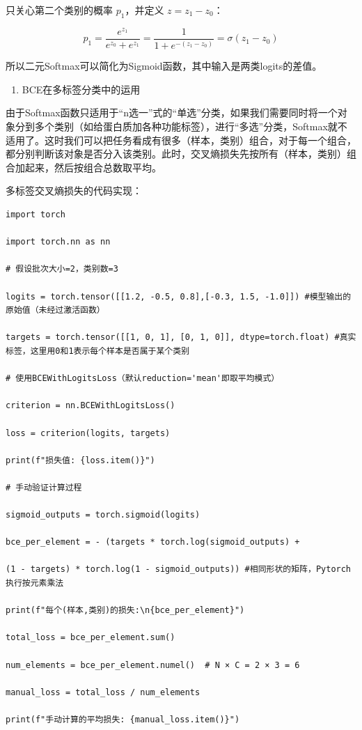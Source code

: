 只关心第二个类别的概率 \(p_1\)，并定义 \(z=z_1-z_0\)：

\[
p_1=\frac{e^{z_1}}{e^{z_0}+e^{z_1}}
=\frac{1}{1+e^{-(z_1-z_0)}}
=\sigma(z_1-z_0)
\]

所以二元Softmax可以简化为Sigmoid函数，其中输入是两类logits的差值。

\begin{enumerate}
\def\labelenumi{\arabic{enumi}.}
\setcounter{enumi}{2}
\tightlist
\item
  BCE在多标签分类中的运用
\end{enumerate}

由于Softmax函数只适用于``n选一''式的``单选''分类，如果我们需要同时将一个对象分到多个类别（如给蛋白质加各种功能标签），进行``多选''分类，Softmax就不适用了。这时我们可以把任务看成有很多（样本，类别）组合，对于每一个组合，都分别判断该对象是否分入该类别。此时，交叉熵损失先按所有（样本，类别）组合加起来，然后按组合总数取平均。

多标签交叉熵损失的代码实现：

\begin{verbatim}
import torch

import torch.nn as nn

# 假设批次大小=2，类别数=3

logits = torch.tensor([[1.2, -0.5, 0.8],[-0.3, 1.5, -1.0]]) #模型输出的原始值（未经过激活函数）

targets = torch.tensor([[1, 0, 1], [0, 1, 0]], dtype=torch.float) #真实标签，这里用0和1表示每个样本是否属于某个类别

# 使用BCEWithLogitsLoss（默认reduction='mean'即取平均模式）

criterion = nn.BCEWithLogitsLoss()

loss = criterion(logits, targets)

print(f"损失值: {loss.item()}")

# 手动验证计算过程

sigmoid_outputs = torch.sigmoid(logits)

bce_per_element = - (targets * torch.log(sigmoid_outputs) +

(1 - targets) * torch.log(1 - sigmoid_outputs)) #相同形状的矩阵，Pytorch执行按元素乘法

print(f"每个(样本,类别)的损失:\n{bce_per_element}")

total_loss = bce_per_element.sum()

num_elements = bce_per_element.numel()  # N × C = 2 × 3 = 6

manual_loss = total_loss / num_elements

print(f"手动计算的平均损失: {manual_loss.item()}")
\end{verbatim}

